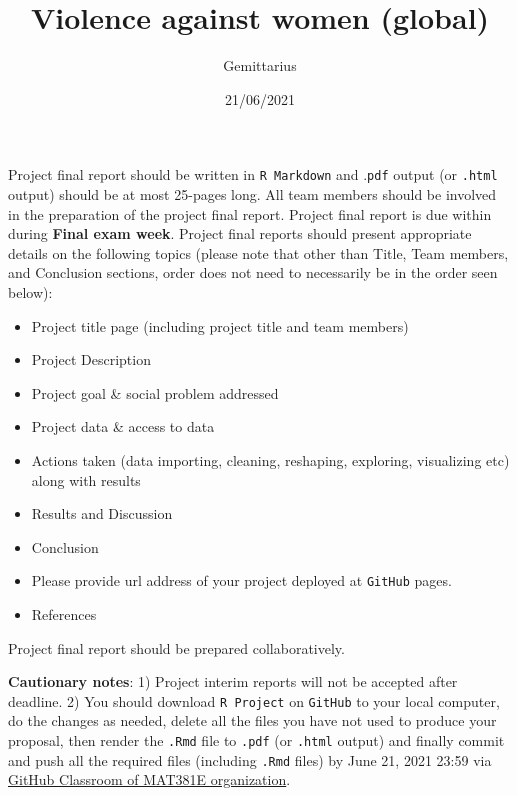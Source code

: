 \documentclass[
]{article}
\title{Violence against women (global)}
\author{Gemittarius}
\date{21/06/2021}
\providecommand{\tightlist}{%
  \setlength{\itemsep}{0pt}\setlength{\parskip}{0pt}}
\begin{document}
\maketitle

Project final report should be written in \texttt{R\ Markdown} and
.\texttt{pdf} output (or \texttt{.html} output) should be at most
25-pages long. All team members should be involved in the preparation of
the project final report. Project final report is due within during
\textbf{Final exam week}. Project final reports should present
appropriate details on the following topics (please note that other than
Title, Team members, and Conclusion sections, order does not need to
necessarily be in the order seen below):

\begin{itemize}
\tightlist
\item
  Project title page (including project title and team members)
\item
  Project Description
\item
  Project goal \& social problem addressed
\item
  Project data \& access to data
\item
  Actions taken (data importing, cleaning, reshaping, exploring,
  visualizing etc) along with results
\item
  Results and Discussion
\item
  Conclusion
\item
  Please provide url address of your project deployed at \texttt{GitHub}
  pages.
\item
  References
\end{itemize}

Project final report should be prepared collaboratively.

\textbf{Cautionary notes}: 1) Project interim reports will not be
accepted after deadline. 2) You should download \texttt{R\ Project} on
\texttt{GitHub} to your local computer, do the changes as needed, delete
all the files you have not used to produce your proposal, then render
the \texttt{.Rmd} file to \texttt{.pdf} (or \texttt{.html} output) and
finally commit and push all the required files (including \texttt{.Rmd}
files) by June 21, 2021 23:59 via
\href{https://github.com/MAT381E}{GitHub Classroom of MAT381E
organization}.

\newpage

\hypertarget{section}{%
\subsection{}\label{section}}
\end{document}
